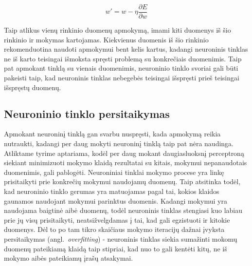\documentclass{VUMIFPSbakalaurinis}
\begin{document}
\begin{equation}\label{eq:learning}
w' = w - \eta\frac{\partial E}{\partial w}
\end{equation}

Taip atlikus vienų rinkinio duomenų apmokymą, imami kiti duomenys iš šio rinkinio ir mokymas kartojamas.
Kiekvienus duomenis iš šio rinkinio rekomenduotina naudoti apmokymui bent kelis kartus, kadangi neuroninis tinklas ne iš karto teisingai išmoksta spręsti problemą su konkrečiais duomenimis.
Taip pat apmokant tinklą su vienais duomenimis, neuroninio tinklo svoriai gali būti pakeisti taip, kad neuroninis tinklas nebegebės teisingai išspręsti prieš teisingai išspręstų duomenų.





\subsection{Neuroninio tinklo persitaikymas}


Apmokant neuroninį tinklą gan svarbu nuspręsti, kada apmokymą reikia nutraukti, kadangi per daug mokyti neuroninį tinklą taip pat nėra naudinga.
Atliktame tyrime \cite[114~psl.]{overfitting} aptariama, kodėl per daug mokant daugiasluoksnį perceptroną siekiant minimizuoti mokymo klaidą rezultatai su kitais, mokymui nepanaudotais duomenimis, gali pablogėti.
Neuroniniai tinklai mokymo procese yra linkę prisitaikyti prie konkrečių mokymui naudojamų duomenų.
Taip atsitinka todėl, kad neuroninio tinklo gerumas yra matuojamas pagal tai, kokios klaidos gaunamos naudojant mokymui parinktus duomenis.
Kadangi mokymui yra naudojama baigtinė aibė duomenų, todėl neuroninis tinklas stengiasi kuo labiau prie jų visų prisitaikyti, neatsižvelgdamas į tai, kad gali egzistuoti ir kitokie duomenys.
Dėl to po tam tikro skaičiaus mokymo iteracijų dažnai įvyksta persitaikymas (angl.~\textit{overfitting}) - neuroninis tinklas siekia sumažinti mokomų duomenų pateikiamą klaidą taip stipriai, kad nuo to gali kentėti kitų, ne iš mokymo aibės pateikiamų įrašų atsakymai.
\end{document}
